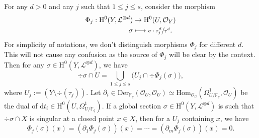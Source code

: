\documentclass[JEP,XML,SOM,Unicode,published]{cedram}
\newcommand\mto{\mathchoice{\longmapsto}{\mapsto}{\mapsto}{\mapsto}}
\theoremstyle{plain}
\theoremstyle{definition}
\newcommand{\ho}{\mathrm{H}}
\newcommand{\Hom}{\mathrm{Hom}}
\newcommand{\Oc}{\mathcal{O}}
\newcommand{\li}{\mathcal{L}}
\newcommand{\F}{\mathbb{F}}
\begin{document}
For any $d>0$ and any $j$ such that $1\leq j\leq s$, consider the morphism
\begin{align*}
\Phi_j: \ho^0(Y,\mathcal{L}^{\otimes d}) & \to \ho^0(U, \Oc_Y) \\
\sigma & \mto \sfrac{\sigma \cdot \tau_j^d}{\tau^d}.
\end{align*}
For simplicity of notations, we don't distinguish morphisms $\Phi_j$ for different $d$. This will not cause any confusion as the source of $\Phi_j$ will be clear by the context. Then for any $\sigma\in \ho^0(Y, \li^{\otimes d})$, we have\vspace*{-3pt}
\[
\div \sigma \cap U=\bigcup_{1\leq j\leq s}\bigl(U_j\cap \div \Phi_j(\sigma)\bigr),
\]
where $U_j:=\left(Y\setminus\div (\tau_j)\right)$. Let $\partial_i\in \mathrm{Der}_{\F_q}(\mathcal{O}_U, \mathcal{O}_U)\simeq \Hom_{\mathcal{O}_U}(\Omega^1_{U/\F_q}, \mathcal{O}_U)$ be the dual of $\mathrm{d}t_i\in \ho^0(U, \Omega^1_{U/\F_q})$. If a global section $\sigma\in \ho^0(Y, \li^{\otimes d})$ is such that $\div \sigma\cap X$ is singular at a closed point $x\in X$, then for a $U_j$ containing $x$, we have\vspace*{-3pt}
\[
\Phi_j(\sigma)(x)=\left(\partial_1 \Phi_j(\sigma)\right)(x)=\cdots =\left(\partial_m \Phi_j(\sigma) \right)(x)=0.
\]
\end{document}
